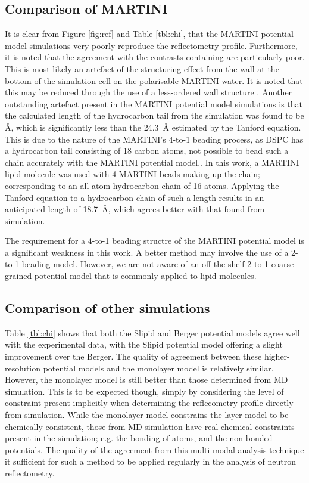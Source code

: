 \documentclass[amsmath,amssymb,twocolumn,superscriptaddress]{revtex4-1}
\begin{document}
\subsection{Comparison of MARTINI}
It is clear from Figure \ref{fig:ref} and Table \ref{tbl:chi}, that the
MARTINI potential model simulations very poorly reproduce the reflectometry
profile.
Furthermore, it is noted that the agreement with the contrasts containing
 are particularly poor.
This is most likely an artefact of the structuring effect from the wall at
the bottom of the simulation cell on the polarisable MARTINI water.
It is noted that this may be reduced through the use of a less-ordered wall
structure \cite{Koutsioubas2016}.
Another outstanding artefact present in the MARTINI potential model
simulations is that the calculated length of the hydrocarbon tail from the
simulation was found to be
\si{\angstrom}, which is
significantly less than the \SI{24.3}{\angstrom} estimated by the Tanford
equation.
This is due to the nature of the MARTINI's 4-to-1 beading process, as DSPC
has a hydrocarbon tail consisting of 18 carbon atoms, not possible to bead
such a chain accurately with the MARTINI potential model..
In this work, a MARTINI lipid molecule was used with 4 MARTINI beads making
up the chain; corresponding to an all-atom hydrocarbon chain of 16 atoms.
Applying the Tanford equation to a hydrocarbon chain of such a length
results in an anticipated length of \SI{18.7}{\angstrom}, which agrees
better with that found from simulation.

The requirement for a 4-to-1 beading structre of the MARTINI potential model
is a significant weakness in this work.
A better method may involve the use of a 2-to-1 beading model.
However, we are not aware of an off-the-shelf 2-to-1 coarse-grained
potential model that is commonly applied to lipid molecules.

\subsection{Comparison of other simulations}
Table \ref{tbl:chi} shows that both the Slipid and Berger potential models agree well with the experimental data, with the Slipid potential model offering a slight improvement over the Berger.
The quality of agreement between these higher-resolution potential models and the monolayer model is relatively similar.
However, the monolayer model is still better than those determined from MD simulation.
This is to be expected though, simply by considering the level of constraint present implicitly when determining the reflecometry profile directly from simulation.
While the monolayer model constrains the layer model to be chemically-consistent, those from MD simulation have real chemical constraints present in the simulation; e.g. the bonding of atoms, and the non-bonded potentials.
The quality of the agreement from this multi-modal analysis technique it sufficient for such a method to be applied regularly in the analysis of neutron reflectometry.
\end{document}
